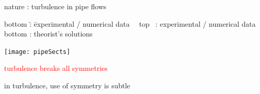 \begin{frame}{nature : turbulence in pipe flows}
\begin{tabbing}
bottom \= : \= experimental / numerical data \kill
~~top~ \> : \> experimental / numerical data \\
bottom \> : \> theorist's solutions
\end{tabbing}
\begin{center}
  \texttt{[image: pipeSects]}
\end{center}
\bigskip

\hfill \textcolor{red}{turbulence breaks all symmetries}
\end{frame}

\begin{frame}{in turbulence, }
use of {\Large symmetry is subtle}

\vfill
\end{frame}

